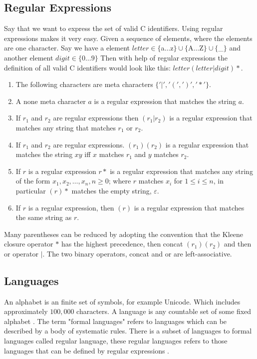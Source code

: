 \subsection{Regular Expressions}
\begin{example}\label{regexpEx}
Say that we want to express the set of valid C identifiers. Using regular 
expressions makes it very easy. Given a sequence of elements, where the elements
are one character.
Say we have a element $letter \in \{$a$ \dots $z$\} \cup \{$A$ \dots $Z$\} \cup 
\{$\_$\}$
and another element $digit \in \{0 \dots 9\}$
Then with help of regular expressions the definition of all valid C identifiers 
would look like this: $letter (letter | digit)*$. 
\end{example}
\begin{definition}\label{regexp} 
\begin{enumerate}
  \item The following characters are meta characters $\{ '|', '(', ')', '*' \}$.
  \item A none meta character $a$ is a regular expression that matches the 
      string $a$.
  \item If $r_1$ and $r_2$ are regular expressions then $(r_1 | r_2)$ is a 
      regular expression that matches any string that matches $r_1$ or $r_2$.
  \item If $r_1$ and $r_2$ are regular expressions. $(r_1)(r_2)$ is a regular
      expression that matches the string $xy$ iff $x$ matches $r_1$
      and $y$ matches $r_2$.
  \item If $r$ is a regular expression $r*$ is a regular expression that
      matches any string of the form $x_1, x_2, \dots , x_n, n \geq 0$;
      where $r$ matches $x_i$ for $1 \leq i \leq n$, in particular $(r)*$ 
      matches the empty string, $\varepsilon$.
  \item If $r$ is a regular expression, then $(r)$ is a regular expression that
      matches the same string as $r$.
\end{enumerate}
\end{definition}
Many parentheses can be reduced by adopting the convention that the Kleene
closure operator $*$ has the highest precedence, then concat $(r_1)(r_2)$ and then or
operator $|$. The two binary operators, concat and or are
left-associative.
\subsection{Languages}
An alphabet is an finite set of symbols, for example Unicode. Which 
includes approximately $100,000$ characters. A language is any 
countable set of some fixed alphabet \cite{Aho2006}.
The term "formal languages" refers to languages which can be described by a body 
of systematic rules. There is a subset of languages to formal languages called 
regular language, these regular languages refers to those languages 
that can be defined by regular expressions \cite{Ranta2012}.
